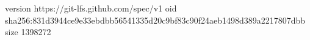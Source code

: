 version https://git-lfs.github.com/spec/v1
oid sha256:831d3944ce9e33ebdbb56541335d20c9bf83c90f24aeb1498d389a2217807dbb
size 1398272
